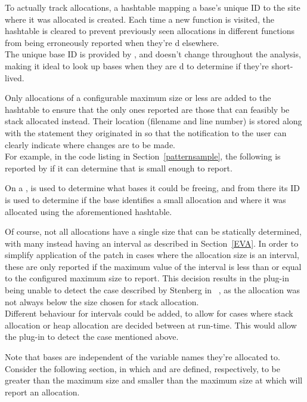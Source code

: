 To actually track allocations, a hashtable mapping a base's unique ID to the site where it was allocated is created. Each time a new function is visited, the hashtable is cleared to prevent previously seen allocations in different functions from being erroneously reported when they're \free{}d elsewhere.\\
The unique base ID is provided by , and doesn't change throughout the analysis, making it ideal to look up bases when they are \free{}d to determine if they're short-lived.

Only allocations of a configurable maximum size or less are added to the hashtable to ensure that the only ones reported are those that can feasibly be stack allocated instead. Their location (filename and line number) is stored along with the statement they originated in so that the notification to the user can clearly indicate where changes are to be made.\\
For example, in the code listing in Section~\ref{patternsample}, the following is reported by  if it can determine that  is small enough to report.



On a \free{},  is used to determine what bases it could be freeing, and from there its ID is used to determine if the base identifies a small allocation and where it was allocated using the aforementioned hashtable.

Of course, not all allocations have a single size that can be statically determined, with many instead having an interval as described in Section~\ref{EVA}. In order to simplify application of the patch in cases where the allocation size is an interval, these are only reported if the maximum value of the interval is less than or equal to the configured maximum size to report. This decision results in the plug-in being unable to detect the case described by Stenberg in ~\cite{curlmalloc}, as the allocation was not always below the size chosen for stack allocation.\\
Different behaviour for intervals could be added, to allow for cases where stack allocation or heap allocation are decided between at run-time. This would allow the plug-in to detect the case mentioned above.

Note that bases are independent of the variable names they're allocated to. Consider the following section, in which  and  are defined, respectively, to be greater than the maximum size and smaller than the maximum size at which  will report an allocation.

